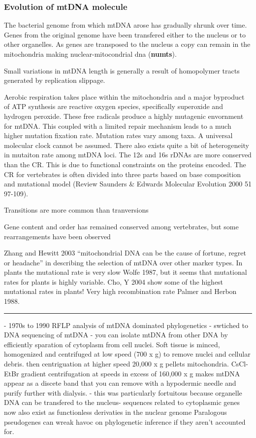 \documentclass[11pt, oneside]{article}
\begin{document}
\subsubsection{Evolution of mtDNA molecule}
The bacterial genome from which mtDNA arose has gradually shrunk over time. Genes from the 
original genome have been transfered either to the nucleus or to other organelles. As genes are 
transposed to the nucleus a copy can remain in the mitochondria making nuclear-mitocondrial dna 
(\textbf{numts}).  

Small variations in mtDNA length is generally a result of homopolymer tracts generated by replication 
slippage. 

Aerobic respiration takes place within the mitochondria and a major byproduct of ATP synthesis are
reactive oxygen species, specifically superoxide and hydrogen peroxide. These free radicals produce a 
highly mutagenic envornment for mtDNA. This coupled with
a limited repair mechanism leads to a much higher mutation fixation rate. Mutation rates vary among taxa.
A universal molecular clock cannot be assumed. There also exists quite a
bit of heterogeneity in mutaiton rate among mtDNA loci. The 12s and 16s rDNAs are more conserved
than the CR. This is due to functional constraints on the proteins encoded.
The CR for vertebrates is often divided into three parts based on base composition and mutational
model (Review Saunders \& Edwards Molecular Evolution 2000 51 97-109).  

Transitions are more common than tranversions


Gene content and order has remained conserved among vertebrates, but some rearrangements have
been observed  

Zhang and Hewitt 2003 ``mitochondrial DNA can be the cause of fortune, regret or headache'' in describing
the selection of mtDNA over other marker types. In plants the mutational rate is very slow Wolfe 1987, but 
it seems that mutational rates for plants is highly variable. Cho, Y 2004 show some of the highest mutational
rates in plants! Very high recombination rate Palmer and Herbon 1988. 

\hrule

- 1970s to 1990 RFLP analysis of mtDNA dominated phylogenetics
- swtiched to DNA sequencing of mtDNA
- you can isolate mtDNA from other DNA by efficiently sparation of cytoplasm from cell nuclei.
Soft tissue is minced, homogenized and centrifuged at low speed (700 x g) to remove nuclei and cellular debris.
then centriguation at higher speed 20,000 x g pellets mitochondria.
CsCl-EtBr gradient centrifugation at speeds in excess of 160,000 x g makes mtDNA appear as a discete band 
that you can remove with a hypodermic needle and purify further with dialysis. 
- this was particularly fortuitous because organelle DNA can be transfered to the nucleus- sequences 
related to cytoplasmic genes now also exist as functionless derivaties in the nuclear genome 
Paralogous pseudogenes can wreak havoc on phylogenetic inference if they aren't accounted for. 
\end{document}
